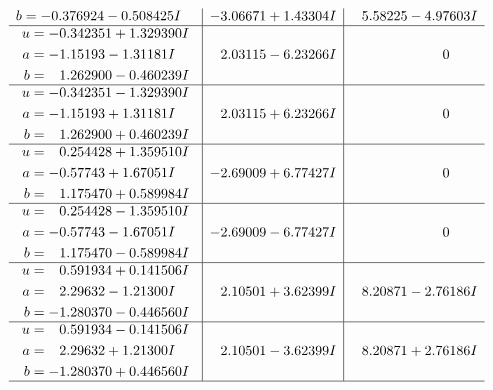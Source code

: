 \documentclass[1p]{elsarticle_modified}
\theoremstyle{definition}
\begin{document}
$$\begin{array}{c|c|c}
\begin{aligned}
b &= -0.376924 - 0.508425 I\end{aligned}
 & -3.06671 + 1.43304 I & \phantom{-}5.58225 - 4.97603 I \\ \hline\begin{aligned}
u &= -0.342351 + 1.329390 I \\
a &= -1.15193 - 1.31181 I \\
b &= \phantom{-}1.262900 - 0.460239 I\end{aligned}
 & \phantom{-}2.03115 - 6.23266 I & \phantom{-0.000000 } 0 \\ \hline\begin{aligned}
u &= -0.342351 - 1.329390 I \\
a &= -1.15193 + 1.31181 I \\
b &= \phantom{-}1.262900 + 0.460239 I\end{aligned}
 & \phantom{-}2.03115 + 6.23266 I & \phantom{-0.000000 } 0 \\ \hline\begin{aligned}
u &= \phantom{-}0.254428 + 1.359510 I \\
a &= -0.57743 + 1.67051 I \\
b &= \phantom{-}1.175470 + 0.589984 I\end{aligned}
 & -2.69009 + 6.77427 I & \phantom{-0.000000 } 0 \\ \hline\begin{aligned}
u &= \phantom{-}0.254428 - 1.359510 I \\
a &= -0.57743 - 1.67051 I \\
b &= \phantom{-}1.175470 - 0.589984 I\end{aligned}
 & -2.69009 - 6.77427 I & \phantom{-0.000000 } 0 \\ \hline\begin{aligned}
u &= \phantom{-}0.591934 + 0.141506 I \\
a &= \phantom{-}2.29632 - 1.21300 I \\
b &= -1.280370 - 0.446560 I\end{aligned}
 & \phantom{-}2.10501 + 3.62399 I & \phantom{-}8.20871 - 2.76186 I \\ \hline\begin{aligned}
u &= \phantom{-}0.591934 - 0.141506 I \\
a &= \phantom{-}2.29632 + 1.21300 I \\
b &= -1.280370 + 0.446560 I\end{aligned}
 & \phantom{-}2.10501 - 3.62399 I & \phantom{-}8.20871 + 2.76186 I\\
 \hline 
 \end{array}$$\newpage$$\begin{array}{c|c|c}  

\end{array}$$
\end{document}
